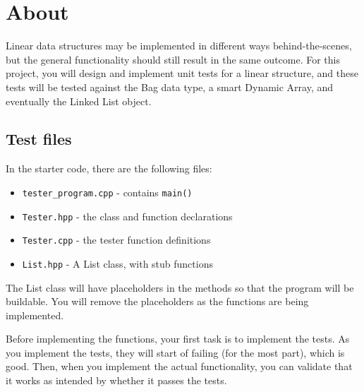 
\newcommand{\laClass}       {CS 250}
\newcommand{\laSemester}    {Spring 2018}
\newcommand{\laChapter}     {}
\newcommand{\laType}        {Project}
\newcommand{\laAssignment}  {1}
\newcommand{\laPoints}      {5}
\newcommand{\laTitle}       {Unit Tests and Linear Structures}
\newcommand{\laStarterFiles}{Download from GitHub.}
\newcommand{\laTopics}      {Design, testing, UML, unit tests}
\setcounter{chapter}{1}
\setcounter{section}{1}
\addtocounter{section}{-1}
\toggletrue{answerkey}
\togglefalse{answerkey}




    \section{About}

    Linear data structures may be implemented in different ways behind-the-scenes,
    but the general functionality should still result in the same outcome.
    For this project, you will design and implement unit tests for a linear structure,
    and these tests will be tested against the Bag data type, a smart Dynamic Array,
    and eventually the Linked List object.

    \subsection{Test files}

    In the starter code, there are the following files:

    \begin{itemize}
        \item   \texttt{tester\_program.cpp} - contains \texttt{main()}
        \item   \texttt{Tester.hpp} - the class and function declarations
        \item   \texttt{Tester.cpp} - the tester function definitions
        \item   \texttt{List.hpp} - A List class, with stub functions
    \end{itemize}

    The List class will have placeholders in the methods so that the program
    will be buildable. You will remove the placeholders as the functions are
    being implemented.

    Before implementing the functions, your first task is to implement the tests.
    As you implement the tests, they will start of failing (for the most part),
    which is good. Then, when you implement the actual functionality, you can
    validate that it works as intended by whether it passes the tests.

